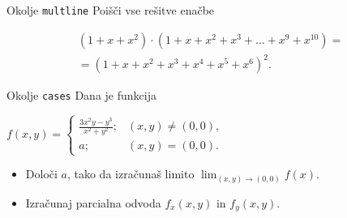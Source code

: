 \begin{frame}{Okolje \texttt{multline}}
	Poišči vse rešitve enačbe
	
	\begin{multline*}
		(1+x+x^2) \cdot (1+x+x^2+x^3+\ldots+x^9+x^{10}) = \\
		=(1+x+x^2+x^3+x^4+x^5+x^6)^2.
	\end{multline*}

	
\end{frame}

\begin{frame}{Okolje \texttt{cases}}
	Dana je funkcija
	
		 $f(x,y)=\begin{cases}
			\frac{3x^2y-y^3}{x^2+y^2}; & (x,y) \neq (0,0), \\
			a; & (x,y) = (0,0).
		\end{cases}$
		
		
	\begin{itemize}
	\item Določi $a$, tako da izračunaš limito \( \lim_{(x,y)\to(0,0)} f(x). \)
	\item Izračunaj parcialna odvoda $f_x(x,y)$ in $f_y(x,y)$.
	\end{itemize}
\end{frame}
